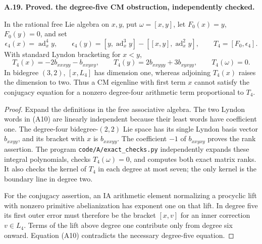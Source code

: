 \documentclass[11pt,oneside]{article}
\makeatletter
\newcounter{statementanchor}
\newenvironment{statement}[3]{%
 \refstepcounter{statementanchor}\def\@currentlabel{#1}%
 \par\addvspace{9pt}\noindent
 \textbf{#1. #2. #3.}\par\nobreak\noindent\ignorespaces
}{\par\addvspace{5pt}}
\makeatother
\begin{document}
\begin{statement}{A.19}{Proved}{the degree-five CM obstruction, independently checked}
\label{st:A.19}
\label{A:cm-degree-five}
In the rational free Lie algebra on $x,y$, put
$\omega=[x,y]$, let $F_0(x)=y$, $F_0(y)=0$, and set
\[
 \epsilon_4(x)=\operatorname{ad}_x^4y,\qquad
 \epsilon_4(y)=[y,\operatorname{ad}_x^3y]
                 -[[x,y],\operatorname{ad}_x^2y],
 \qquad T_4=[F_0,\epsilon_4].
\]
With standard Lyndon bracketing for $x<y$,
\[
 T_4(x)=-2b_{xxxyy}-b_{xxyxy},\qquad
 T_4(y)=2b_{xxyyy}+3b_{xyxyy},\qquad T_4(\omega)=0.
                                                               \tag{A10}
\]
In bidegree $(3,2)$, $[x,L_4]$ has dimension one,
whereas adjoining $T_4(x)$ raises the dimension to
two.  Thus a CM eigenline with first term $x$
cannot satisfy the conjugacy equation for a
nonzero degree-four arithmetic term proportional
to $T_4$.
\end{statement}
\begin{proof}
Expand the definitions in the free associative
algebra.  The two Lyndon words in (A10) are
linearly independent because their least words
have coefficient one.  The degree-four
bidegree-$(2,2)$ Lie space has its single
Lyndon basis vector $b_{xxyy}$, and its bracket
with $x$ is $b_{xxxyy}$.  The coefficient
$-1$ of $b_{xxyxy}$ proves the rank assertion.
The program \texttt{code/A/exact\_checks.py}
independently expands these integral polynomials,
checks $T_4(\omega)=0$, and computes both exact
matrix ranks.  It also checks the kernel of
$T_4$ in each degree at most seven; the only
kernel is the boundary line in degree two.

For the conjugacy assertion, an IA arithmetic
element normalizing a procyclic lift with
nonzero primitive abelianization has exponent
one on that lift.  In degree five its first
outer error must therefore be the bracket
$[x,v]$ for an inner correction $v\in L_4$.
Terms of the lift above degree one contribute
only from degree six onward.  Equation (A10)
contradicts the necessary degree-five equation.
\end{proof}
\end{document}
